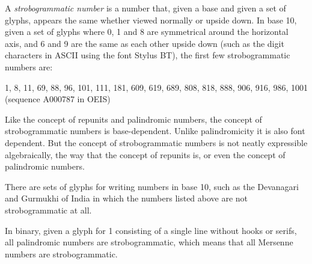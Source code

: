 \documentclass[12pt]{article}
\begin{document}
A {\em strobogrammatic number} is a number that, given a base and given a set of glyphs, appears the same whether viewed normally or upside down. In base 10, given a set of glyphs where 0, 1 and 8 are symmetrical around the horizontal axis, and 6 and 9 are the same as each other upside down (such as the digit characters in ASCII using the font Stylus BT), the first few strobogrammatic numbers are:

1, 8, 11, 69, 88, 96, 101, 111, 181, 609, 619, 689, 808, 818, 888, 906, 916, 986, 1001 (sequence A000787 in OEIS)

Like the concept of repunits and palindromic numbers, the concept of strobogrammatic numbers is base-dependent. Unlike palindromicity it is also font dependent. But the concept of strobogrammatic numbers is not neatly expressible algebraically, the way that the concept of repunits is, or even the concept of palindromic numbers.

There are sets of glyphs for writing numbers in base 10, such as the Devanagari and Gurmukhi of India in which the numbers listed above are not strobogrammatic at all.

In binary, given a glyph for 1 consisting of a single line without hooks or serifs, all palindromic numbers are strobogrammatic, which means that all Mersenne numbers are strobogrammatic.
\end{document}

